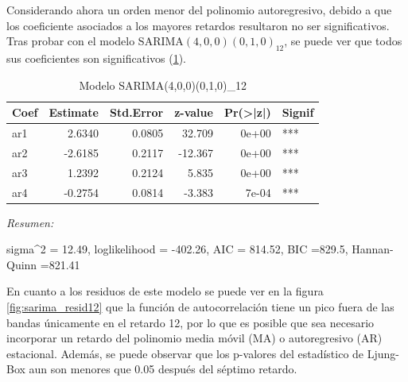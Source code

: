 \documentclass[12pt,oneside]{book}\usepackage[]{graphicx}\usepackage[]{color}
\newenvironment{knitrout}{}{} %
\theoremstyle{definition} %
\begin{document}


Considerando ahora un orden menor del polinomio autoregresivo, debido a que los coeficiente asociados a los mayores retardos resultaron no ser significativos. Tras probar con el modelo SARIMA$(4,0,0)(0,1,0)_{12}$, se puede ver que todos sus coeficientes son significativos (\ref{mod:sarima_resid12}).


\begin{knitrout}
\color{fgcolor}\begin{table}

\caption{\label{tab:unnamed-chunk-16}\label{mod:sarima_resid12}Modelo SARIMA(4,0,0)(0,1,0)_{12}}
\centering
\begin{threeparttable}
\begin{tabular}[t]{lrrrrl}
\toprule
Coef & Estimate & Std.Error & z-value & Pr(>|z|) & Signif\\
\midrule
\rowcolor{gray!6}  ar1 & 2.6340 & 0.0805 & 32.709 & 0e+00 & ***\\
ar2 & -2.6185 & 0.2117 & -12.367 & 0e+00 & ***\\
\rowcolor{gray!6}  ar3 & 1.2392 & 0.2124 & 5.835 & 0e+00 & ***\\
ar4 & -0.2754 & 0.0814 & -3.383 & 7e-04 & ***\\
\bottomrule
\end{tabular}
\begin{tablenotes}
\item \textit{Resumen:} 
\item sigma\textasciicircum{}2 = 12.49, loglikelihood = -402.26, AIC = 814.52, BIC =829.5, Hannan-Quinn =821.41
\end{tablenotes}
\end{threeparttable}
\end{table}


\end{knitrout}


En cuanto a los residuos de este modelo se puede ver en la figura \ref{fig:sarima_resid12} que la función de autocorrelación tiene un pico fuera de las bandas únicamente en el retardo 12, por lo que es posible que sea necesario incorporar un retardo del polinomio media móvil (MA) o autoregresivo (AR) estacional. Además, se puede observar que los p-valores del estadístico de Ljung-Box aun son menores que 0.05 después del séptimo retardo.
\end{document}
